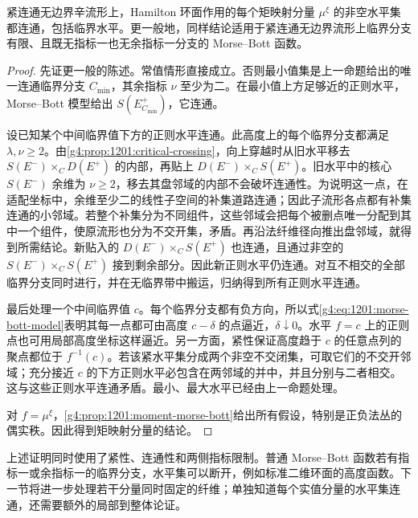\begin{theorem}\label{g4:thm:1201:component-connected-levels}
	紧连通无边界辛流形上，Hamilton 环面作用的每个矩映射分量 \(\mu^\xi\) 的非空水平集都连通，包括临界水平。更一般地，同样结论适用于紧连通无边界流形上临界分支有限、且既无指标一也无余指标一分支的 Morse–Bott 函数。
\end{theorem}
\begin{proof}
	先证更一般的陈述。常值情形直接成立。否则最小值集是上一命题给出的唯一连通临界分支 \(C_{\min}\)，其余指标 \(\nu\) 至少为二。在最小值上方足够近的正则水平，Morse–Bott 模型给出 \(S(E_{C_{\min}}^+)\)，它连通。

	设已知某个中间临界值下方的正则水平连通。此高度上的每个临界分支都满足 \(\lambda,\nu\geq2\)。由\cref{g4:prop:1201:critical-crossing}，向上穿越时从旧水平移去 \(S(E^-)\times_C D(E^+)\) 的内部，再贴上 \(D(E^-)\times_C S(E^+)\)。旧水平中的核心 \(S(E^-)\) 余维为 \(\nu\geq2\)，移去其盘邻域的内部不会破坏连通性。为说明这一点，在适配坐标中，余维至少二的线性子空间的补集道路连通；因此子流形各点都有补集连通的小邻域。若整个补集分为不同组件，这些邻域会把每个被删点唯一分配到其中一个组件，使原流形也分为不交开集，矛盾。再沿法纤维径向推出盘邻域，就得到所需结论。新贴入的 \(D(E^-)\times_C S(E^+)\) 也连通，且通过非空的 \(S(E^-)\times_C S(E^+)\) 接到剩余部分。因此新正则水平仍连通。对互不相交的全部临界分支同时进行，并在无临界带中搬运，归纳得到所有正则水平连通。

	最后处理一个中间临界值 \(c\)。每个临界分支都有负方向，所以式\eqref{g4:eq:1201:morse-bott-model}表明其每一点都可由高度 \(c-\delta\) 的点逼近，\(\delta\downarrow0\)。水平 \(f=c\) 上的正则点也可用局部高度坐标这样逼近。另一方面，紧性保证高度趋于 \(c\) 的任意点列的聚点都位于 \(f^{-1}(c)\)。若该紧水平集分成两个非空不交闭集，可取它们的不交开邻域；充分接近 \(c\) 的下方正则水平必包含在两邻域的并中，并且分别与二者相交。这与这些正则水平连通矛盾。最小、最大水平已经由上一命题处理。

	对 \(f=\mu^\xi\)，\cref{g4:prop:1201:moment-morse-bott}给出所有假设，特别是正负法丛的偶实秩。因此得到矩映射分量的结论。
\end{proof}

上述证明同时使用了紧性、连通性和两侧指标限制。普通 Morse–Bott 函数若有指标一或余指标一的临界分支，水平集可以断开，例如标准二维环面的高度函数。下一节将进一步处理若干分量同时固定的纤维；单独知道每个实值分量的水平集连通，还需要额外的局部到整体论证。
